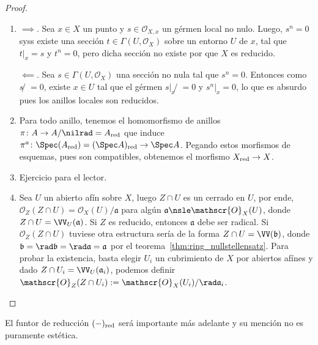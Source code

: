\begin{proof}
	\begin{enumerate}
		\item $\implies.$ Sea $x \in X$ un punto y $s \in \mathscr{O}_{X, x}$ un gérmen local no nulo.
			Luego, $s^n = 0$ syss existe una sección $t \in \Gamma(U, \mathscr{O}_X)$ sobre un entorno $U$ de $x$, tal que $t|_x = s$ y $t^n = 0$,
			pero dicha sección no existe por que $X$ es reducido.

			$\impliedby.$ Sea $s \in \Gamma(U, \mathscr{O}_X)$ una sección no nula tal que $s^n = 0$. Entonces
			como $s ̸= 0$, existe $x \in U$ tal que el gérmen $s|_x ̸= 0$ y $s^n|_x = 0$, lo que es absurdo pues los anillos locales son reducidos.

		\item Para todo anillo, tenemos el homomorfismo de anillos $\pi \colon A \to A/\nilrad = A_{\rm red}$
			que induce $\pi^a \colon \Spec(A_{\rm red}) = (\Spec A)_{\rm red} \to \Spec A$.
			Pegando estos morfismos de esquemas, pues son compatibles, obtenemos el morfismo $X_{\rm red} \to X$.
		\item Ejercicio para el lector.
		\item Sea $U$ un abierto afín sobre $X$, luego $Z\cap U$ es un cerrado en $U$, por ende,
			$\mathscr{O}_Z(Z \cap U ) = \mathscr{O}_X(U)/\mathfrak{a}$ para algún $\mathfrak{a} \nsle \mathscr{O}_X(U)$,
			donde $Z \cap U = \VV_U(\mathfrak{a})$.
			Si $Z$ es reducido, entonces $\mathfrak{a}$ debe ser radical.
			Si $\mathscr{O}_Z (Z \cap U )$ tuviese otra estructura sería de la forma $Z \cap U = \VV(\mathfrak{b})$,
			donde $\mathfrak{b} = \rad\mathfrak{b} = \rad\mathfrak{a} = \mathfrak{a}$ por el teorema~\ref{thm:ring_nullstellensatz}.
			Para probar la existencia, basta elegir $U_i$ un cubrimiento de $X$ por abiertos afínes y dado $Z \cap U_i = \VV_U(\mathfrak{a}_i)$,
			podemos definir $\mathscr{O}_Z (Z \cap U_i) := \mathscr{O}_X(U_i)/\rad\mathfrak{a}_i$. \qedhere
	\end{enumerate}
\end{proof}
El funtor de reducción $(-)_{\rm red}$ será importante más adelante y su mención no es puramente estética.

